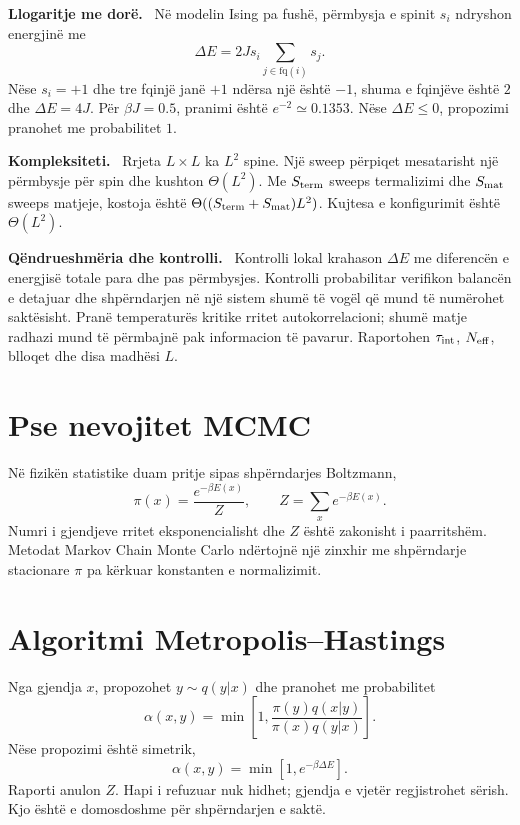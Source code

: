 \documentclass[11pt,oneside,openany]{book}
\newenvironment{llogaritjedore}{\par\medskip\noindent\textbf{Llogaritje me dorë.}\ }{\par\medskip}
\newenvironment{kompleksitet}{\par\medskip\noindent\textbf{Kompleksiteti.}\ }{\par\medskip}
\newenvironment{qendrueshmeri}{\par\medskip\noindent\textbf{Qëndrueshmëria dhe kontrolli.}\ }{\par\medskip}
\begin{document}
\begin{llogaritjedore}
Në modelin Ising pa fushë, përmbysja e spinit $s_i$ ndryshon energjinë me
\begin{equation}
 \Delta E=2Js_i\sum_{j\in\mathrm{fq}(i)}s_j.
\end{equation}
Nëse $s_i=+1$ dhe tre fqinjë janë $+1$ ndërsa një është $-1$, shuma e
fqinjëve është $2$ dhe $\Delta E=4J$. Për $\beta J=0.5$, pranimi është
$e^{-2}\simeq0.1353$. Nëse $\Delta E\leq0$, propozimi pranohet me
probabilitet $1$.
\end{llogaritjedore}

\begin{kompleksitet}
Rrjeta $L\times L$ ka $L^2$ spine. Një sweep përpiqet mesatarisht një
përmbysje për spin dhe kushton $\Theta(L^2)$. Me $S_{\rm term}$ sweeps
termalizimi dhe $S_{\rm mat}$ sweeps matjeje, kostoja është
$\Theta((S_{\rm term}+S_{\rm mat})L^2)$. Kujtesa e konfigurimit është
$\Theta(L^2)$.
\end{kompleksitet}

\begin{qendrueshmeri}
Kontrolli lokal krahason $\Delta E$ me diferencën e energjisë totale para dhe
pas përmbysjes. Kontrolli probabilitar verifikon balancën e detajuar dhe
shpërndarjen në një sistem shumë të vogël që mund të numërohet saktësisht.
Pranë temperaturës kritike rritet autokorrelacioni; shumë matje radhazi mund
të përmbajnë pak informacion të pavarur. Raportohen $\tau_{\rm int}$,
$N_{\rm eff}$, blloqet dhe disa madhësi $L$.
\end{qendrueshmeri}



\section{Pse nevojitet MCMC}
Në fizikën statistike duam pritje sipas shpërndarjes Boltzmann,
\begin{equation}
 \pi(x)=\frac{e^{-\beta E(x)}}{Z},\qquad
 Z=\sum_xe^{-\beta E(x)}.
\end{equation}
Numri i gjendjeve rritet eksponencialisht dhe $Z$ është zakonisht i paarritshëm. Metodat Markov Chain Monte Carlo ndërtojnë një zinxhir me shpërndarje stacionare $\pi$ pa kërkuar konstanten e normalizimit.

\section{Algoritmi Metropolis--Hastings}
Nga gjendja $x$, propozohet $y\sim q(y|x)$ dhe pranohet me probabilitet
\begin{equation}
 \alpha(x,y)=\min\left[1,\frac{\pi(y)q(x|y)}{\pi(x)q(y|x)}\right].
\end{equation}
Nëse propozimi është simetrik,
\begin{equation}
 \alpha(x,y)=\min[1,e^{-\beta\Delta E}].
\end{equation}
Raporti anulon $Z$. Hapi i refuzuar nuk hidhet; gjendja e vjetër regjistrohet sërish. Kjo është e domosdoshme për shpërndarjen e saktë.
\end{document}
